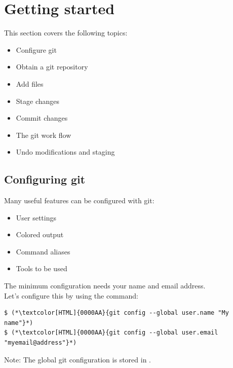 \section{Getting started}
\begin{frame}[fragile]
  \slidetitle

  This section covers the following topics:
  \begin{itemize}
    \item Configure git
    \item Obtain a git repository
    \item Add files
    \item Stage changes
    \item Commit changes
    \item The git work flow
    \item Undo modifications and staging
  \end{itemize}
\end{frame}

\subsection{Configuring git}
\begin{frame}[fragile]
  \subslidetitle
  Many useful features can be configured with git:
  \begin{itemize}
    \item User settings
    \item Colored output
    \item Command aliases
    \item Tools to be used
  \end{itemize}

  \vspace{1em}
  The minimum configuration needs your name and email address.\\
  Let's configure this by using the  command:
  \begin{lstlisting}
$ (*\textcolor[HTML]{0000AA}{git config --global user.name "My name"}*)
$ (*\textcolor[HTML]{0000AA}{git config --global user.email "myemail@address"}*)
\end{lstlisting}

  \vspace{1em}
  Note: The global git configuration is stored in .

\end{frame}

